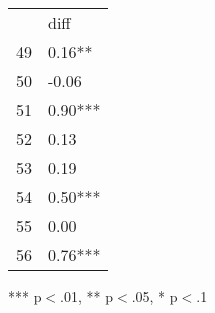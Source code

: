 \documentclass{article}
\begin{document}
\begin{table}[!h]
\centering
\begin{tabular}{ll}
\cline{1-2}
\multicolumn{1}{|l}{} &
  \multicolumn{1}{|l|}{diff} \\
\cline{1-2}
\multicolumn{1}{|l}{49} &
  \multicolumn{1}{|l|}{0.16**} \\
\cline{1-2}
\multicolumn{1}{|l}{50} &
  \multicolumn{1}{|l|}{-0.06} \\
\cline{1-2}
\multicolumn{1}{|l}{51} &
  \multicolumn{1}{|l|}{0.90***} \\
\cline{1-2}
\multicolumn{1}{|l}{52} &
  \multicolumn{1}{|l|}{0.13} \\
\cline{1-2}
\multicolumn{1}{|l}{53} &
  \multicolumn{1}{|l|}{0.19} \\
\cline{1-2}
\multicolumn{1}{|l}{54} &
  \multicolumn{1}{|l|}{0.50***} \\
\cline{1-2}
\multicolumn{1}{|l}{55} &
  \multicolumn{1}{|l|}{0.00} \\
\cline{1-2}
\multicolumn{1}{|l}{56} &
  \multicolumn{1}{|l|}{0.76***} \\
\cline{1-2}
\end{tabular}

\footnotesize{
*** p$<$.01, ** p$<$.05, * p$<$.1
}
\end{table}
\end{document}
